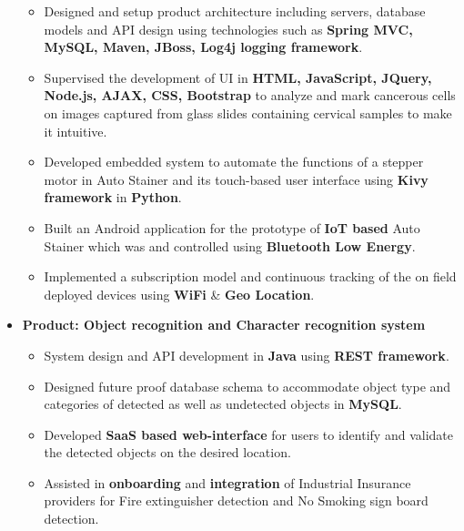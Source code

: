 \documentclass[10pt,a4paper,ragged2e,withhyper]{altacv}
\begin{document}
\begin{paracol}{2}
\begin{itemize}
\begin{itemize}
\item Designed and setup product architecture including servers, database models and API design using technologies such as \textbf{Spring MVC, MySQL, Maven, JBoss, Log4j logging framework}.
\item Supervised the development of UI in \textbf{HTML, JavaScript, JQuery, Node.js, AJAX, CSS, Bootstrap} to analyze and mark cancerous cells on images captured from glass slides containing cervical samples to make it intuitive.
\item Developed embedded system to automate the functions of a stepper motor in Auto Stainer and its touch-based user interface using \textbf{Kivy framework} in \textbf{Python}.
\item Built an Android application for the prototype of \textbf{IoT based} Auto Stainer which was  and controlled using \textbf{Bluetooth Low Energy}.
\item Implemented a subscription model and continuous tracking of the on field deployed devices using \textbf{WiFi} \& \textbf{Geo Location}.

\end{itemize}


\item[\textbf{2.}] \textbf{Product: Object recognition and Character recognition system}
\begin{itemize}
\item System design and API development in \textbf{Java} using \textbf{REST framework}.
\item Designed future proof database schema to accommodate object type and categories of detected as well as undetected objects in \textbf{MySQL}.
\item Developed \textbf{SaaS based web-interface} for users to identify and validate the detected objects on the desired location.
\item Assisted in \textbf{onboarding} and \textbf{integration} of Industrial Insurance providers for Fire extinguisher detection and No Smoking sign board detection.
\end{itemize}

\end{itemize}


\divider


\end{paracol}
\end{document}
